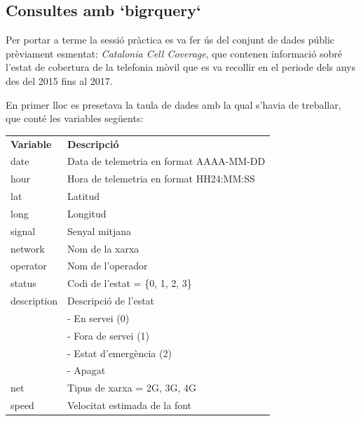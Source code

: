 \documentclass[12pt,longbibliography]{article}
\theoremstyle{definition}
\theoremstyle{remark}
\begin{document}
\subsection{Consultes amb `bigrquery`}


Per portar a terme la sessió pràctica es va fer ús del conjunt de dades públic prèviament esmentat: \emph{Catalonia Cell Coverage}, que contenen informació sobré l'estat de cobertura de la telefonia mòvil que es va recollir en el periode dels anys des del 2015 fins al 2017.


En primer lloc es presetava la taula de dades amb la qual s'havia de treballar, que conté les variables següents:


\begin{longtable}[H]{p{} | p{} } 
\textbf{Variable} & \textbf{Descripció}                              \\ 
date              & Data de telemetria en format AAAA-MM-DD          \\
hour              & Hora de telemetria en format HH24:MM:SS          \\
lat               & Latitud                                          \\
long              & Longitud                                         \\
signal            & Senyal mitjana                                   \\
network           & Nom de la xarxa                                  \\
operator          & Nom de l'operador                                \\
status            & Codi de l'estat = \{0, 1, 2, 3\}                 \\
description       & Descripció de l'estat                            \\
                  & - En servei (0)                                  \\
                  & - Fora de servei (1)                             \\
                  & - Estat d'emergència (2)                         \\
                  & - Apagat                                         \\
net               & Tipus de xarxa = 2G, 3G, 4G                      \\
speed             & Velocitat estimada de la font                    \\

\end{longtable}
\end{document}
